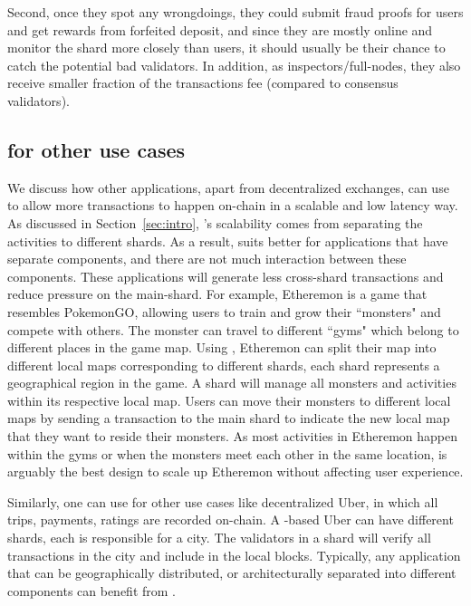 Second, once they spot any wrongdoings, they could submit fraud proofs for users and get rewards from forfeited deposit, and since they are mostly online and monitor the shard more closely than users, it should usually be their chance to catch the potential bad validators. In addition, as inspectors/full-nodes, they also receive smaller fraction of the transactions fee (compared to consensus validators).

\subsection{\codename for other use cases}
\label{sec:others}

We discuss how other applications, apart from decentralized exchanges, can use \codename to allow more transactions to happen on-chain in a scalable and low latency way. As discussed in Section~\ref{sec:intro}, \codename's scalability comes from separating the activities to different shards. As a result, \codename suits better for applications that have separate components, and there are not much interaction between these components. These applications will generate less cross-shard transactions and reduce pressure on the main-shard.
For example, Etheremon is a game that resembles PokemonGO, allowing users to train and grow their ``monsters" and compete with others. The monster can travel to different ``gyms" which belong to different places in the game map. Using \codename, Etheremon can split their map into different local maps corresponding to different shards, each shard represents a geographical region in the game. A shard will manage all monsters and activities within its respective local map. Users can move their monsters to different local maps by sending a transaction to the main shard to indicate the new local map that they want to reside their monsters. As most activities in Etheremon happen within the gyms or when the monsters meet each other in the same location, \codename is arguably the best design to scale up Etheremon without affecting user experience.

Similarly, one can use \codename for other use cases like decentralized Uber,
in which all trips, payments, ratings are recorded on-chain. A \codename-based
Uber can have different shards, each is responsible for a city. The validators
in a shard will verify all transactions in the city and include in the local
blocks. Typically, any application that can be geographically distributed, or
architecturally separated into different components can benefit from
\codename.
